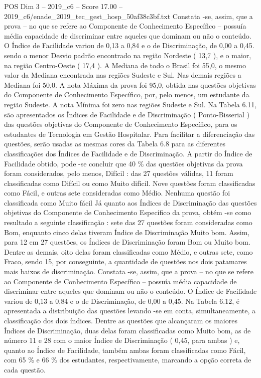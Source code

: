 \begin{textsample}{POS Dim 3 – 2019\_c6 – Score 17.00 – 2019\_c6/enade\_2019\_tec\_gest\_hosp\_50af38c3bf.txt}
Constata -se, assim, que a prova – no que se refere ao Componente de Conhecimento Específico – possuía média capacidade de discriminar entre aqueles que dominam ou não o conteúdo.
O Índice de Facilidade variou de 0,13 a 0,84 e o de Discriminação, de 0,00 a 0,45. sendo o menor Desvio padrão encontrado na região Nordeste ( 13,7 ), e o maior, na região Centro-Oeste ( 17,4 ).
A Mediana de todo o Brasil foi 55,0, o mesmo valor da Mediana encontrada nas regiões Sudeste e Sul.
Nas demais regiões a Mediana foi 50,0.
A nota Máxima da prova foi 95,0, obtida nas questões objetivas do Componente de Conhecimento Específico, por, pelo menos, um estudante da região Sudeste.
A nota Mínima foi zero nas regiões Sudeste e Sul.
Na Tabela 6.11, são apresentados os Índices de Facilidade e de Discriminação ( Ponto-Bisserial ) das questões objetivas do Componente de Conhecimento Específico, para os estudantes de Tecnologia em Gestão Hospitalar.
Para facilitar a diferenciação das questões, serão usadas as mesmas cores da Tabela 6.8 para as diferentes classificações dos Índices de Facilidade e de Discriminação.
A partir do Índice de Facilidade obtido, pode -se concluir que 40 \% das questões objetivas da prova foram considerados, pelo menos, Difícil : das 27 questões válidas, 11 foram classificadas como Difícil ou como Muito difícil.
Nove questões foram classificadas como Fácil, e outras sete consideradas como Médio.
Nenhuma questão foi classificada como Muito fácil Já quanto aos Índices de Discriminação das questões objetivas do Componente de Conhecimento Específico da prova, obtém -se como resultado a seguinte classificação : sete das 27 questões foram consideradas como Bom, enquanto cinco delas tiveram Índice de Discriminação Muito bom.
Assim, para 12 em 27 questões, os Índices de Discriminação foram Bom ou Muito bom.
Dentre as demais, oito delas foram classificadas como Médio, e outras sete, como Fraco, sendo 15, por conseguinte, a quantidade de questões nos dois patamares mais baixos de discriminação.
Constata -se, assim, que a prova – no que se refere ao Componente de Conhecimento Específico – possuía média capacidade de discriminar entre aqueles que dominam ou não o conteúdo.
O Índice de Facilidade variou de 0,13 a 0,84 e o de Discriminação, de 0,00 a 0,45.
Na Tabela 6.12, é apresentada a distribuição das questões levando -se em conta, simultaneamente, a classificação dos dois índices.
Dentre as questões que alcançaram os maiores Índices de Discriminação, duas delas foram classificadas como Muito bom, as de número 11 e 28 com o maior Índice de Discriminação ( 0,45, para ambas ) e, quanto ao Índice de Facilidade, também ambas foram classificadas como Fácil, com 65 \% e 66 \% dos estudantes, respectivamente, marcando a opção correta de cada questão.

\end{textsample}
